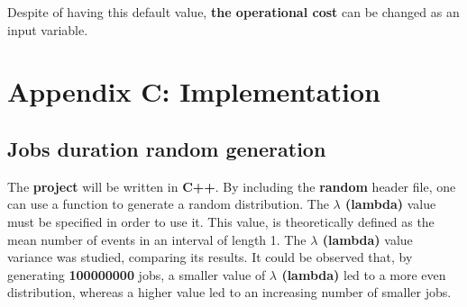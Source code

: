 \documentclass{scrreprt}
\begin{document}
Despite of having this default value, \textbf{the operational cost} can be changed as an input variable.

\section{Appendix C: Implementation}

\subsection{Jobs duration random generation}

The \textbf{project} will be written in \textbf{C++}. By including the \textbf{random} header file,  one can use a function to generate a random distribution. The \textbf{$\lambda$ (lambda)} value must be specified in order to use it.  This value, is theoretically defined as the mean number of events in an interval of length 1. The \textbf{$\lambda$ (lambda)} value variance was studied, comparing its results. It could be observed that, by generating \textbf{100000000} jobs, a smaller value of \textbf{$\lambda$ (lambda)} led to a more even distribution, whereas a higher value led to an increasing number of smaller jobs.
\end{document}
